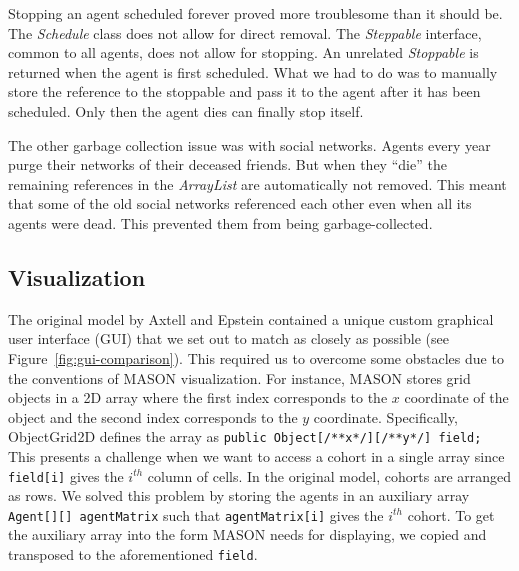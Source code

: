 \documentclass[runningheads,a4paper]{article}
\begin{document}
Stopping an agent scheduled forever proved more troublesome than it should be.
The \textit{Schedule} class does not allow for direct removal. 
The \textit{Steppable} interface, common to all agents, does not allow for stopping.
An unrelated \textit{Stoppable} is returned when the agent is first scheduled.
What we had to do was to manually store the reference to the stoppable and pass it to the agent after it has been scheduled.
Only then the agent dies can finally stop itself.

The other garbage collection issue was with social networks.
Agents every year purge their networks of their deceased friends. 
But when they ``die'' the remaining references in the \textit{ArrayList} are automatically not removed.
This meant that some of the old social networks referenced each other even when all its agents were dead.
This prevented them from being garbage-collected.


\subsection{Visualization}

The original model by Axtell and Epstein contained a unique custom graphical user interface (GUI) that we set out to match as closely as possible (see Figure~\ref{fig:gui-comparison}).
This required us to overcome some obstacles due to the conventions of MASON visualization. 
For instance, MASON stores grid objects in a 2D array where the first index corresponds to the $x$ coordinate of the object and the second index corresponds to the $y$ coordinate. 
Specifically, ObjectGrid2D defines the array as \lstinline!public Object[/**x*/][/**y*/] field;! 
This presents a challenge when we want to access a cohort in a single array since \lstinline!field[i]! gives the $i^{th}$ column of cells. In the original model, cohorts are arranged as rows. 
We solved this problem by storing the agents in an auxiliary array \lstinline!Agent[][] agentMatrix! such that \lstinline!agentMatrix[i]! gives the $i^{th}$ cohort.
To get the auxiliary array into the form MASON needs for displaying, we copied and transposed to the aforementioned \lstinline!field!.
\end{document}
